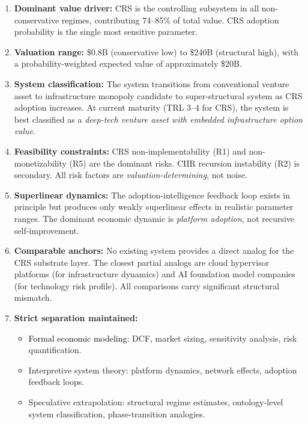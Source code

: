 \documentclass[11pt,a4paper]{article}
\theoremstyle{remark}
\newcommand{\formal}[1]{\textcolor{black}{#1}}
\newcommand{\interpretive}[1]{\textcolor{blue!70!black}{#1}}
\newcommand{\speculative}[1]{\textcolor{red!70!black}{#1}}
\begin{document}
\begin{enumerate}
  \item \textbf{Dominant value driver:} CRS is the controlling
        subsystem in all non-conservative regimes, contributing
        74--85\% of total value.  CRS adoption probability is the
        single most sensitive parameter.

  \item \textbf{Valuation range:} \$0.8B (conservative low) to
        \$240B (structural high), with a probability-weighted
        expected value of approximately \$20B.

  \item \textbf{System classification:} The system transitions from
        conventional venture asset to infrastructure monopoly
        candidate to super-structural system as CRS adoption
        increases.  At current maturity (TRL 3--4 for CRS), the
        system is best classified as a \emph{deep-tech venture asset
        with embedded infrastructure option value}.

  \item \textbf{Feasibility constraints:} CRS non-implementability
        (R1) and non-monetizability (R5) are the dominant risks.
        CIIR recursion instability (R2) is secondary.  All risk
        factors are \emph{valuation-determining}, not noise.

  \item \textbf{Superlinear dynamics:} The adoption-intelligence
        feedback loop exists in principle but produces only weakly
        superlinear effects in realistic parameter ranges.  The
        dominant economic dynamic is \emph{platform adoption}, not
        recursive self-improvement.

  \item \textbf{Comparable anchors:} No existing system provides a
        direct analog for the CRS substrate layer.  The closest
        partial analogs are cloud hypervisor platforms (for
        infrastructure dynamics) and AI foundation model companies
        (for technology risk profile).  All comparisons carry
        significant structural mismatch.

  \item \textbf{Strict separation maintained:}
        \begin{itemize}[nosep]
          \item \formal{Formal economic modeling}: DCF, market
                sizing, sensitivity analysis, risk quantification.
          \item \interpretive{Interpretive system theory}: platform
                dynamics, network effects, adoption feedback loops.
          \item \speculative{Speculative extrapolation}: structural
                regime estimates, ontology-level system
                classification, phase-transition analogies.
        \end{itemize}
\end{enumerate}
\end{document}
